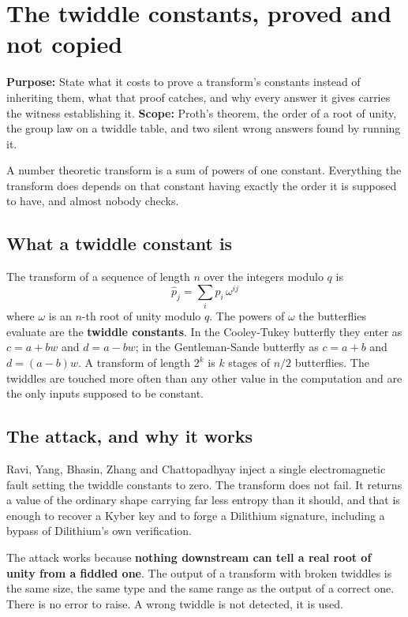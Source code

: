 \chapter{The twiddle constants, proved and not copied}

\textbf{Purpose:} State what it costs to prove a transform's constants instead of inheriting them, what that proof catches, and why every answer it gives carries the witness establishing it. \textbf{Scope:} Proth's theorem, the order of a root of unity, the group law on a twiddle table, and two silent wrong answers found by running it.

A number theoretic transform is a sum of powers of one constant. Everything the transform does depends on that constant having exactly the order it is supposed to have, and almost nobody checks.

\section{What a twiddle constant is}

The transform of a sequence of length \(n\) over the integers modulo \(q\) is
\[
\hat{p}_j = \sum_i p_i \, \omega^{ij}
\]
where \(\omega\) is an \(n\)-th root of unity modulo \(q\). The powers of \(\omega\) the butterflies evaluate are the \textbf{twiddle constants}. In the Cooley-Tukey butterfly they enter as \(c = a + bw\) and \(d = a - bw\); in the Gentleman-Sande butterfly as \(c = a + b\) and \(d = (a-b)w\). A transform of length \(2^k\) is \(k\) stages of \(n/2\) butterflies. The twiddles are touched more often than any other value in the computation and are the only inputs supposed to be constant.

\section{The attack, and why it works}

Ravi, Yang, Bhasin, Zhang and Chattopadhyay inject a single electromagnetic fault setting the twiddle constants to zero. The transform does not fail. It returns a value of the ordinary shape carrying far less entropy than it should, and that is enough to recover a Kyber key and to forge a Dilithium signature, including a bypass of Dilithium's own verification.

The attack works because \textbf{nothing downstream can tell a real root of unity from a fiddled one}. The output of a transform with broken twiddles is the same size, the same type and the same range as the output of a correct one. There is no error to raise. A wrong twiddle is not detected, it is used.

